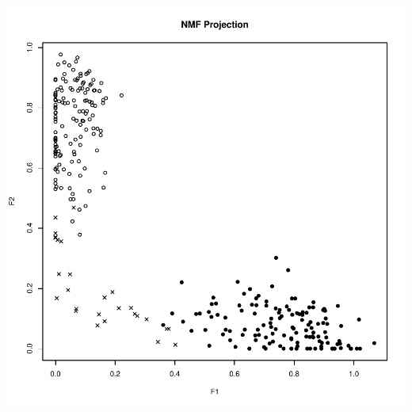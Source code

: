 \documentclass{article}\usepackage[]{graphicx}\usepackage[]{color}
\makeatletter
\def\maxwidth{ %
  \ifdim\Gin@nat@width>\linewidth
    \linewidth
  \else
    \Gin@nat@width
  \fi
}
\newenvironment{knitrout}{}{} %
\makeatother
\begin{document}
\begin{knitrout}
{\centering \includegraphics[width=\maxwidth]{figure/plots-5} 

}



\end{knitrout}
\end{document}
